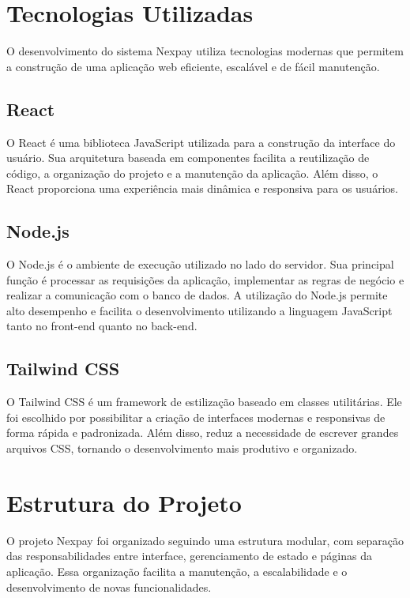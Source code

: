 \documentclass{article}
\begin{document}
\section{Tecnologias Utilizadas}

O desenvolvimento do sistema Nexpay utiliza tecnologias modernas que permitem a construção de uma aplicação web eficiente, escalável e de fácil manutenção.

\subsection{React}

O React é uma biblioteca JavaScript utilizada para a construção da interface do usuário. Sua arquitetura baseada em componentes facilita a reutilização de código, a organização do projeto e a manutenção da aplicação. Além disso, o React proporciona uma experiência mais dinâmica e responsiva para os usuários.

\subsection{Node.js}

O Node.js é o ambiente de execução utilizado no lado do servidor. Sua principal função é processar as requisições da aplicação, implementar as regras de negócio e realizar a comunicação com o banco de dados. A utilização do Node.js permite alto desempenho e facilita o desenvolvimento utilizando a linguagem JavaScript tanto no front-end quanto no back-end.

\subsection{Tailwind CSS}

O Tailwind CSS é um framework de estilização baseado em classes utilitárias. Ele foi escolhido por possibilitar a criação de interfaces modernas e responsivas de forma rápida e padronizada. Além disso, reduz a necessidade de escrever grandes arquivos CSS, tornando o desenvolvimento mais produtivo e organizado.



\section{Estrutura do Projeto}

O projeto Nexpay foi organizado seguindo uma estrutura modular, com separação das responsabilidades entre interface, gerenciamento de estado e páginas da aplicação. Essa organização facilita a manutenção, a escalabilidade e o desenvolvimento de novas funcionalidades.
\end{document}
